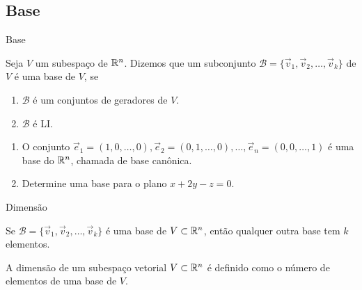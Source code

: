 \subsection*{Base}
\begin{frame}[label=lild]{Base}
\begin{defin}
Seja $V$ um subespaço de $\mathbb{R}^n$. Dizemos que um subconjunto $\mathcal{B}=\{\vec{v}_1,\vec{v}_2,\ldots,\vec{v}_k\}$ de $V$ é uma {\color{blue}base} de $V$, se
\begin{enumerate}
\item $\mathcal{B}$ é um conjuntos de geradores de $V$.
\item $\mathcal{B}$ é LI.
\end{enumerate}
\end{defin}
\begin{exe}
\begin{enumerate}
\item O conjunto $\vec{e}_1=(1,0,\ldots,0), \vec{e}_2=(0,1,\ldots,0),\ldots, \vec{e}_n=(0,0,\ldots,1)$ é uma base do $\mathbb{R}^n$, chamada de {\color{blue}base canônica}.
\item Determine uma base para o plano $x+2y-z=0$.
\end{enumerate}

\end{exe}



\end{frame}

\begin{frame}[label=lild]{Dimensão}

\begin{teo}
Se $\mathcal{B}=\{\vec{v}_1,\vec{v}_2,\ldots,\vec{v}_k\}$ é uma base de $V\subset\mathbb{R}^n$, então qualquer outra base tem $k$ elementos. 
\end{teo}


\begin{defin}
A {\color{blue}dimensão} de um subespaço vetorial $V\subset\mathbb{R}^n$ é definido como o número de elementos de uma base de $V$.
\end{defin}


\end{frame}

